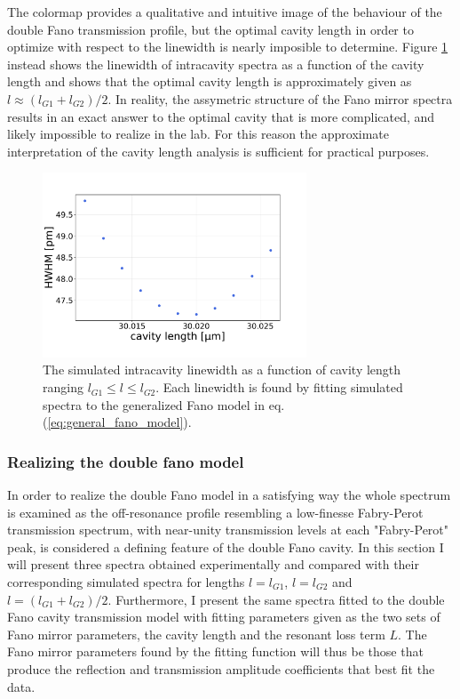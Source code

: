 The colormap provides a qualitative and intuitive image of the behaviour of the double Fano transmission profile, but the optimal cavity length in order to optimize with respect to the linewidth is nearly imposible to determine. Figure \ref{fig:G1/G2_lw_vs_cavity_length} instead shows the linewidth of intracavity spectra as a function of the cavity length and shows that the optimal cavity length is approximately given as $l \approx (l_{G1} + l_{G2})/2$. In reality, the assymetric structure of the Fano mirror spectra results in an exact answer to the optimal cavity that is more complicated, and likely impossible to realize in the lab. For this reason the approximate interpretation of the cavity length analysis is sufficient for practical purposes.

\begin{figure}[h!]
    \centering
    \includegraphics[width=0.7\textwidth]{figures/results/M3:M5/M3:M5_lw_vs_length.pdf}
    \caption{The simulated intracavity linewidth as a function of cavity length ranging $l_{G1} \leq l \leq l_{G2}$. Each linewidth is found by fitting simulated spectra to the generalized Fano model in eq. (\ref{eq:general_fano_model}).}
    \label{fig:G1/G2_lw_vs_cavity_length}
\end{figure}

\subsubsection{Realizing the double fano model}\label{sec:realizing_the_double_fano_model}

In order to realize the double Fano model in a satisfying way the whole spectrum is examined as the off-resonance profile resembling a low-finesse Fabry-Perot transmission spectrum, with near-unity transmission levels at each "Fabry-Perot" peak, is considered a defining feature of the double Fano cavity. In this section I will present three spectra obtained experimentally and compared with their corresponding simulated spectra for lengths $l=l_{G1}$, $l=l_{G2}$ and $l=(l_{G1} + l_{G2})/2$. Furthermore, I present the same spectra fitted to the double Fano cavity transmission model with fitting parameters given as the two sets of Fano mirror parameters, the cavity length and the resonant loss term $L$. The Fano mirror parameters found by the fitting function will thus be those that produce the reflection and transmission amplitude coefficients that best fit the data. 

